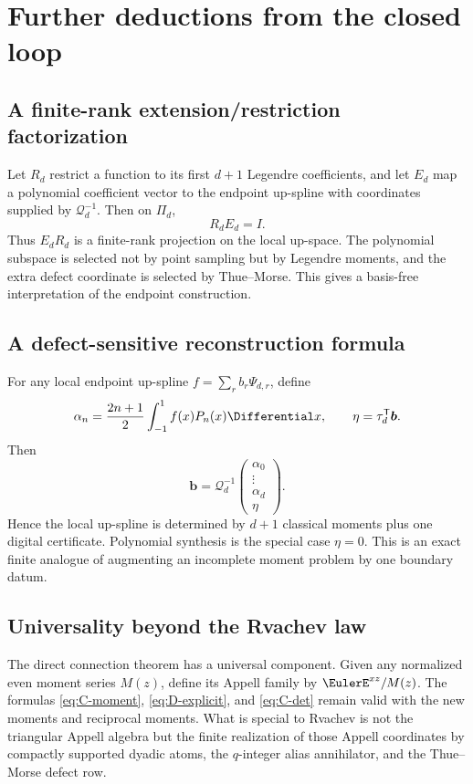 \documentclass[11pt,oneside]{article}
\theoremstyle{definition}
\theoremstyle{remark}
\newcommand{\cQ}{\mathcal Q}
\begin{document}
\section{Further deductions from the closed loop}
\label{sec:deductions}

\subsection{A finite-rank extension/restriction factorization}
Let $R_d$ restrict a function to its first $d+1$ Legendre coefficients, and
let $E_d$ map a polynomial coefficient vector to the endpoint up-spline with
coordinates supplied by $\cQ_d^{-1}$.  Then on $\Pi_d$,
\begin{equation}
 R_dE_d=I.
 \label{eq:right-inverse}
\end{equation}
Thus $E_dR_d$ is a finite-rank projection on the local up-space.  The
polynomial subspace is selected not by point sampling but by Legendre moments,
and the extra defect coordinate is selected by Thue--Morse.  This gives a
basis-free interpretation of the endpoint construction.

\subsection{A defect-sensitive reconstruction formula}
For any local endpoint up-spline
$f=\sum_rb_r\Psi_{d,r}$, define
\begin{equation}
 \alpha_n=\frac{2n+1}{2}\int_{-1}^{1}f(x)P_n(x)\Differential x,
 \qquad
 \eta=\tau_d^{\mathsf T}\bm b.
 \label{eq:alpha-eta}
\end{equation}
Then
\begin{equation}
 \bm b=\cQ_d^{-1}
 \begin{pmatrix}\alpha_0\\ \vdots\\ \alpha_d\\ \eta\end{pmatrix}.
 \label{eq:full-reconstruction}
\end{equation}
Hence the local up-spline is determined by $d+1$ classical moments plus one
digital certificate.  Polynomial synthesis is the special case $\eta=0$.
This is an exact finite analogue of augmenting an incomplete moment problem by
one boundary datum.

\subsection{Universality beyond the Rvachev law}
The direct connection theorem has a universal component.  Given any normalized
even moment series $M(z)$, define its Appell family by $\EulerE^{xz}/M(z)$.  The
formulas \eqref{eq:C-moment}, \eqref{eq:D-explicit}, and
\eqref{eq:C-det} remain valid with the new moments and reciprocal moments.
What is special to Rvachev is not the triangular Appell algebra but the finite
realization of those Appell coordinates by compactly supported dyadic atoms,
the $q$-integer alias annihilator, and the Thue--Morse defect row.
\end{document}
